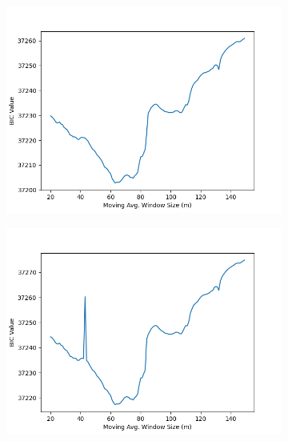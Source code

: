 \documentclass[12pt]{article}
\begin{document}
\begin{figure}[!ht]
  \begin{subfigure}[!ht]{0.45\textwidth}
    \includegraphics[width=\linewidth]{Prop_Vol_Cr}
  \end{subfigure}\hfill
  \begin{subfigure}[!ht]{0.45\textwidth}
    \includegraphics[width=\linewidth]{Vol_Cr}
  \end{subfigure}

\end{figure}
\end{document}
